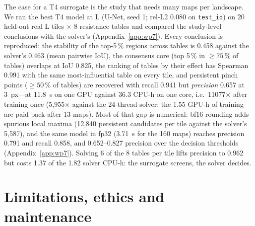 \documentclass{article}
\newcommand{\relltwo}{rel-L2}
\newcommand{\code}[1]{\texttt{#1}}
\begin{document}
The case for a T4 surrogate is the study that needs many maps per landscape. We ran the best T4 model at L (U-Net, seed 1; \relltwo{} 0.080 on \code{test\_id}) on 20 held-out real L tiles $\times$ 8 resistance tables and compared the study-level conclusions with the solver's (Appendix~\ref{app:wp7}). Every conclusion is reproduced: the stability of the top-5\,\% regions across tables is 0.458 against the solver's 0.463 (mean pairwise IoU), the consensus core (top 5\,\% in $\ge 75$\,\% of tables) overlaps at IoU 0.825, the ranking of tables by their effect has Spearman 0.991 with the same most-influential table on every tile, and persistent pinch points ($\ge 50$\,\% of tables) are recovered with recall 0.941 but \emph{precision} 0.657 at 3~px---at 11.8~s on one GPU against 36.3 CPU-h on one core, i.e.\ 11077$\times$ after training once (5,955$\times$ against the 24-thread solver; the 1.55 GPU-h of training are paid back after 13 maps). Most of that gap is numerical: bf16 rounding adds spurious local maxima (12,840 persistent candidates per tile against the solver's 5,587), and the same model in fp32 (3.71~s for the 160 maps) reaches precision 0.791 and recall 0.858, and 0.652--0.827 precision over the decision thresholds (Appendix~\ref{app:wp7}). Solving 6 of the 8 tables per tile lifts precision to 0.962 but costs 1.37 of the 1.82 solver CPU-h: the surrogate screens, the solver decides.

\section{Limitations, ethics and maintenance}
\label{sec:limitations}
\end{document}
